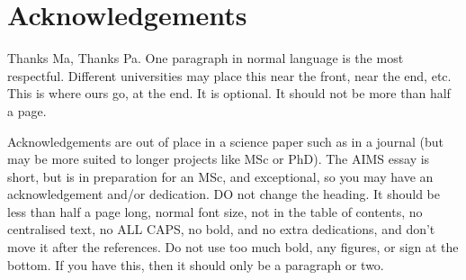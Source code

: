 \chapter*{Acknowledgements}

Thanks Ma, Thanks Pa. One paragraph in normal language is the most respectful. Different universities may place this near the front, near the end, etc. This is where ours go, at the end. It is optional. It should not be more than half a page. 

Acknowledgements are out of place in a science paper such as in a journal (but may be more suited to longer projects like MSc or PhD).
The AIMS essay is short, but is in preparation for an MSc, and exceptional, so you may have an acknowledgement and/or dedication. DO not change the heading. It should be less than half a page long, normal font size, not in the table of contents, no centralised text, no ALL CAPS, no bold, and no extra dedications, and don't move it after the references. Do not
use too much bold, any figures, or sign at the bottom. If you have this, then it should only be a paragraph or two.